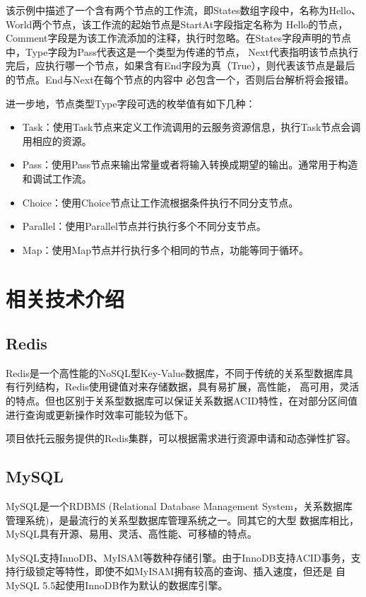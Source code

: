 该示例中描述了一个含有两个节点的工作流，即States数组字段中，名称为Hello、World两个节点，该工作流的起始节点是StartAt字段指定名称为
Hello的节点，Comment字段是为该工作流添加的注释，执行时忽略。在States字段声明的节点中，Type字段为Pass代表这是一个类型为传递的节点，
Next代表指明该节点执行完后，应执行哪一个节点，如果含有End字段为真（True），则代表该节点是最后的节点。End与Next在每个节点的内容中
必包含一个，否则后台解析将会报错。

进一步地，节点类型Type字段可选的枚举值有如下几种：
\begin{itemize}
    \item Task：使用Task节点来定义工作流调用的云服务资源信息，执行Task节点会调用相应的资源。
    \item Pass：使用Pass节点来输出常量或者将输入转换成期望的输出。通常用于构造和调试工作流。
    \item Choice：使用Choice节点让工作流根据条件执行不同分支节点。
    \item Parallel：使用Parallel节点并行执行多个不同分支节点。
    \item Map：使用Map节点并行执行多个相同的节点，功能等同于循环。
\end{itemize}



\section{相关技术介绍}

\subsection{Redis}
Redis是一个高性能的NoSQL型Key-Value数据库，不同于传统的关系型数据库具有行列结构，Redis使用键值对来存储数据，具有易扩展，高性能，
高可用，灵活的特点。但也区别于关系型数据库可以保证关系数据ACID特性，在对部分区间值进行查询或更新操作时效率可能较为低下。

项目依托云服务提供的Redis集群，可以根据需求进行资源申请和动态弹性扩容。

\subsection{MySQL}
MySQL是一个RDBMS (Relational Database Management System，关系数据库管理系统)，是最流行的关系型数据库管理系统之一。同其它的大型
数据库相比，MySQL具有开源、易用、灵活、高性能、可移植的特点。

MySQL支持InnoDB、MyISAM等数种存储引擎。由于InnoDB支持ACID事务，支持行级锁定等特性，即使不如MyISAM拥有较高的查询、插入速度，但还是
自MySQL 5.5起使用InnoDB作为默认的数据库引擎。


